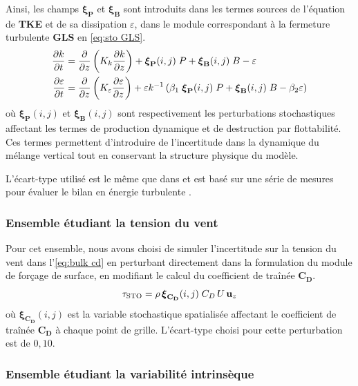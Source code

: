 Ainsi, les champs $\boldsymbol{\xi}_{\textbf{P}}$ et $\boldsymbol{\xi}_{\textbf{B}}$ sont introduits dans les termes sources de l'équation de \textbf{TKE} et de sa dissipation $\varepsilon$, dans le module correspondant à la fermeture turbulente \textbf{GLS} en \autoref{eq:sto GLS}.
\begin{subequations}
\label{eq:sto GLS}
\begin{align}
	\frac{\partial k}{\partial t} & = \frac{\partial }{\partial z} \left( K_k \frac{\partial k}{\partial z} \right) + \boldsymbol{\xi}_{\textbf{P}}(i,j) \; P + \boldsymbol{\xi}_{\textbf{B}}(i,j) \; B - \varepsilon \\
	\frac{\partial \varepsilon}{\partial t} & = \frac{\partial }{\partial z} \left( K_\varepsilon \frac{\partial \varepsilon}{\partial z} \right) + \varepsilon k^{-1} \left( \beta_1 \; \boldsymbol{\xi}_{\textbf{P}}(i,j) \; P + \boldsymbol{\xi}_{\textbf{B}}(i,j) \; B - \beta_2 \varepsilon \right)
\end{align}
\end{subequations}
où $\boldsymbol{\xi}_{\textbf{P}}(i,j)$ et $\boldsymbol{\xi}_{\textbf{B}}(i,j)$ sont respectivement les perturbations stochastiques affectant les termes de production dynamique et de destruction par flottabilité. Ces termes permettent d’introduire de l’incertitude dans la dynamique du mélange vertical tout en conservant la structure physique du modèle.

L'écart-type utilisé est le même que dans \cite{juricke_stochastic_2017} et est basé sur une série de mesures pour évaluer le bilan en énergie turbulente \cite{goodman_measuring_2006}.

\subsubsection{Ensemble étudiant la tension du vent}

Pour cet ensemble, nous avons choisi de simuler l'incertitude sur la tension du vent dans l'\autoref{eq:bulk cd} en perturbant directement dans la formulation du module de forçage de surface, en modifiant le calcul du coefficient de traînée $\mathbf{C_D}$.
\begin{equation}
	\label{eq:sto bulk cd}
	\tau_{\text{STO}} = \rho \, \boldsymbol{\xi}_{\mathbf{C_D}}(i,j) \; C_D \, U \, \mathbf{u}_z
\end{equation}
où $\boldsymbol{\xi}_{\mathbf{C_D}}(i,j)$ est la variable stochastique spatialisée affectant le coefficient de traînée $\mathbf{C_D}$ à chaque point de grille. L'écart-type choisi pour cette perturbation est de $0,10$.

\subsubsection{Ensemble étudiant la variabilité intrinsèque}

